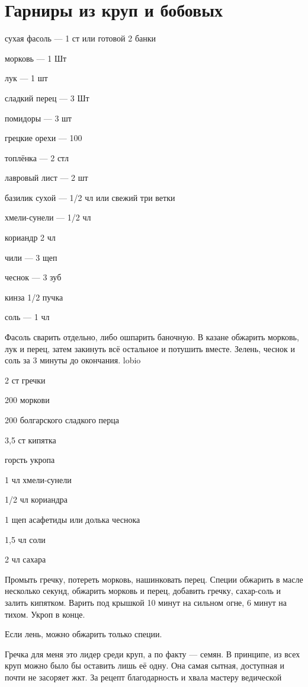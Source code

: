 \chapter*{Гарниры из круп и бобовых}
\label{sec:garnish}



{
\item сухая фасоль — 1 ст или готовой 2 банки
\item морковь — 1 Шт
\item лук — 1 шт
\item сладкий перец — 3 Шт
\item помидоры — 3 шт
\item грецкие орехи — 100 
\item топлёнка — 2 стл 
}{
\item лавровый лист — 2 шт
\item базилик сухой — 1/2 чл или свежий три ветки
\item хмели-сунели — 1/2 чл
\item кориандр 2 чл
\item чили — 3 щеп
\item чеснок — 3 зуб
\item кинза 1/2 пучка
\item соль — 1 чл
}{
Фасоль сварить отдельно, либо ошпарить баночную. В казане обжарить морковь, лук и перец, затем закинуть всё остальное и потушить вместе. Зелень, чеснок и соль за 3 минуты до окончания.
}{}{lobio}

{
\item 2 ст гречки
\item 200 моркови
\item 200 болгарского сладкого перца
\item 3,5 ст кипятка
\item горсть укропа
}{
\item 1 чл хмели-сунели
\item 1/2 чл кориандра
\item 1 щеп асафетиды или долька чеснока
\item 1,5 чл соли
\item 2 чл сахара
}{
Промыть гречку, потереть морковь, нашинковать перец. Специи обжарить в масле несколько секунд, обжарить морковь и перец, добавить гречку, сахар-соль и залить кипятком. Варить под крышкой 10 минут на сильном огне, 6 минут на тихом. Укроп в конце.
}{
\begin{advice}
\item Если лень, можно обжарить только специи.
\item Гречка для меня это лидер среди круп, а по факту — семян. В принципе, из всех круп можно было бы оставить лишь её одну. Она самая сытная, доступная и почти не засоряет жкт. За рецепт благодарность и хвала мастеру ведической 
\end{advice}}{}



